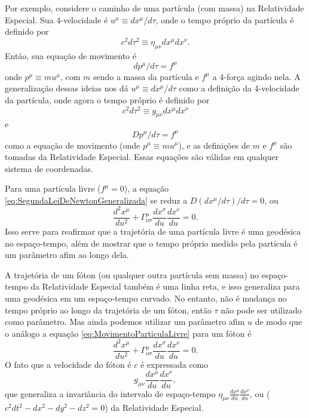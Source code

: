 Por exemplo, considere o caminho de uma partícula (com massa) na Relatividade Especial. Sua 4-velocidade é $u^{\mu}\equiv dx^{\mu}/d\tau$, onde o tempo próprio da partícula é definido por
\[
	c^2d\tau^2 \equiv \eta_{\mu\nu} dx^{\mu}dx^\nu.
\]
Então, sua equação de movimento é
\[
	dp^\mu/d\tau=f^\mu
\]
onde $p^\mu \equiv mu^\mu$, com $m$ sendo a massa da partícula e $f^\mu$ a 4-força agindo nela. A generalização dessas ideias nos dá $u^{\mu}\equiv dx^{\mu}/d\tau$ como a definição da 4-velocidade da partícula, onde agora o tempo próprio é definido por
\begin{equation}\label{eq:DefinicaoTempoProprioRelatividadeGeral}
	c^2d\tau^2 \equiv g_{\mu\nu} dx^\mu dx^\nu
\end{equation}
e
\begin{equation}\label{eq:SegundaLeiDeNewtonGeneralizada}
	Dp^\mu/d\tau = f^\mu
\end{equation}
como a equação de movimento (onde $p^\mu\equiv mu^\mu$), e as definições de $m$ e $f^\mu$ são tomadas da Relatividade Especial. Essas equações são válidas em qualquer sistema de coordenadas.

Para uma partícula livre ($f^\mu=0$), a equação \eqref{eq:SegundaLeiDeNewtonGeneralizada} se reduz a $D(dx^\mu/d\tau)/d\tau = 0$, ou
\begin{equation}\label{eq:MovimentoParticulaLivre}
	\boxed{
		\frac{d^{2} x^{\mu}}{d u^{2}}+\Gamma_{\nu \sigma}^{\mu} \frac{d x^{\sigma}}{d u} \frac{d x^{\nu}}{d u}=0.
	}
\end{equation}
Isso serve para reafirmar que a trajetória de uma partícula livre é uma geodésica no espaço-tempo, além de mostrar que o tempo próprio medido pela partícula é um parâmetro afim ao longo dela.

A trajetória de um fóton (ou qualquer outra partícula sem massa) no espaço-tempo da Relatividade Especial também é uma linha reta, e isso generaliza para uma geodésica em um espaço-tempo curvado. No entanto, não é mudança no tempo próprio ao longo da trajetória de um fóton, então $\tau$ não pode ser utilizado como parâmetro. Mas ainda podemos utilizar um parâmetro afim $u$ de modo que o análogo a equação \eqref{eq:MovimentoParticulaLivre} para um fóton é
\begin{equation}\label{eq:MovimentoFoton}
	\boxed{
		\frac{d^{2} x^{\mu}}{d u^{2}}+\Gamma_{\nu \sigma}^{\mu} \frac{d x^{\sigma}}{d u} \frac{d x^{\nu}}{d u}=0.
	}
\end{equation}
O fato que a velocidade do fóton é $c$ é expressada como
\begin{equation}
	g_{\mu\nu}\frac{dx^\mu}{du}\frac{dx^\nu}{du},
\end{equation}
que generaliza a invariância do intervalo de espaço-tempo $\eta_{\mu\nu}\frac{dx^\mu}{du}\frac{dx^\nu}{du}$, ou ($c^2dt^2-dx^2-dy^2-dz^2=0$) da Relatividade Especial.


